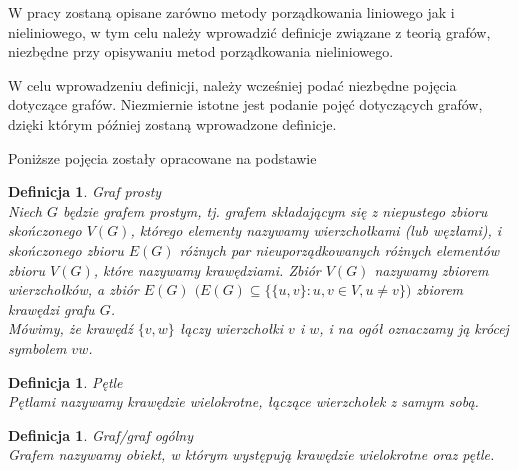 \documentclass[12pt,a4paper]{report}
\newtheorem{definition}[theorem]{Definicja}
\begin{document}
W pracy zostaną opisane zarówno metody porządkowania liniowego jak i nieliniowego, w tym celu należy wprowadzić definicje związane z teorią grafów, niezbędne przy opisywaniu metod porządkowania nieliniowego.

W celu wprowadzeniu definicji, należy wcześniej podać niezbędne pojęcia dotyczące grafów. Niezmiernie istotne jest podanie pojęć dotyczących grafów, dzięki którym później zostaną wprowadzone definicje.

Poniższe pojęcia zostały opracowane na podstawie \cite{wilson2008}\\





\begin{definition}{Graf prosty \cite[Rozdział 2]{wilson2008}\\}
Niech $G$ będzie grafem prostym, tj. grafem składającym się z niepustego zbioru skończonego $V(G)$, którego elementy nazywamy wierzchołkami (lub węzłami), i skończonego zbioru $E(G)$ różnych par nieuporządkowanych różnych elementów zbioru $V(G)$, które nazywamy krawędziami. Zbiór $V(G)$ nazywamy zbiorem wierzchołków, a zbiór $E(G)$ $\big (E(G) \subseteq \{\{u,v\}: u,v \in V, u\neq v\} \big)$ zbiorem krawędzi grafu $G$.\\
Mówimy, że krawędź $\{v,w\}$ łączy wierzchołki $v$ i $w$, i na ogół oznaczamy ją krócej symbolem $vw$.\\
\end{definition}

\begin{definition}{Pętle \cite[Rozdział 2]{wilson2008}\\}
Pętlami nazywamy krawędzie wielokrotne, łączące wierzchołek z samym sobą.\\
\end{definition}

\begin{definition}{Graf/graf ogólny \cite[Rozdział 2]{wilson2008}\\}
Grafem nazywamy obiekt, w którym występują krawędzie wielokrotne oraz pętle.\\
\end{definition}
\end{document}
